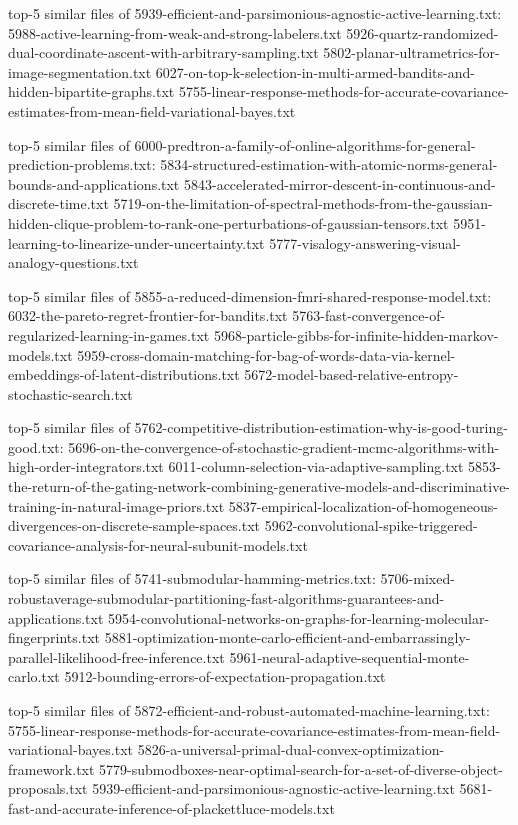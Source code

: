 \documentclass[11pt]{article}
\begin{document}
top-5 similar files of
5939-efficient-and-parsimonious-agnostic-active-learning.txt:
5988-active-learning-from-weak-and-strong-labelers.txt
5926-quartz-randomized-dual-coordinate-ascent-with-arbitrary-sampling.txt
5802-planar-ultrametrics-for-image-segmentation.txt
6027-on-top-k-selection-in-multi-armed-bandits-and-hidden-bipartite-graphs.txt
5755-linear-response-methods-for-accurate-covariance-estimates-from-mean-field-variational-bayes.txt

top-5 similar files of
6000-predtron-a-family-of-online-algorithms-for-general-prediction-problems.txt:
5834-structured-estimation-with-atomic-norms-general-bounds-and-applications.txt
5843-accelerated-mirror-descent-in-continuous-and-discrete-time.txt
5719-on-the-limitation-of-spectral-methods-from-the-gaussian-hidden-clique-problem-to-rank-one-perturbations-of-gaussian-tensors.txt
5951-learning-to-linearize-under-uncertainty.txt
5777-visalogy-answering-visual-analogy-questions.txt

top-5 similar files of
5855-a-reduced-dimension-fmri-shared-response-model.txt:
6032-the-pareto-regret-frontier-for-bandits.txt
5763-fast-convergence-of-regularized-learning-in-games.txt
5968-particle-gibbs-for-infinite-hidden-markov-models.txt
5959-cross-domain-matching-for-bag-of-words-data-via-kernel-embeddings-of-latent-distributions.txt
5672-model-based-relative-entropy-stochastic-search.txt

top-5 similar files of
5762-competitive-distribution-estimation-why-is-good-turing-good.txt:
5696-on-the-convergence-of-stochastic-gradient-mcmc-algorithms-with-high-order-integrators.txt
6011-column-selection-via-adaptive-sampling.txt
5853-the-return-of-the-gating-network-combining-generative-models-and-discriminative-training-in-natural-image-priors.txt
5837-empirical-localization-of-homogeneous-divergences-on-discrete-sample-spaces.txt
5962-convolutional-spike-triggered-covariance-analysis-for-neural-subunit-models.txt

top-5 similar files of 5741-submodular-hamming-metrics.txt:
5706-mixed-robustaverage-submodular-partitioning-fast-algorithms-guarantees-and-applications.txt
5954-convolutional-networks-on-graphs-for-learning-molecular-fingerprints.txt
5881-optimization-monte-carlo-efficient-and-embarrassingly-parallel-likelihood-free-inference.txt
5961-neural-adaptive-sequential-monte-carlo.txt
5912-bounding-errors-of-expectation-propagation.txt

top-5 similar files of
5872-efficient-and-robust-automated-machine-learning.txt:
5755-linear-response-methods-for-accurate-covariance-estimates-from-mean-field-variational-bayes.txt
5826-a-universal-primal-dual-convex-optimization-framework.txt
5779-submodboxes-near-optimal-search-for-a-set-of-diverse-object-proposals.txt
5939-efficient-and-parsimonious-agnostic-active-learning.txt
5681-fast-and-accurate-inference-of-plackettluce-models.txt
\end{document}
